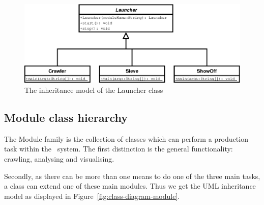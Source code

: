 \begin{figure}[htp]
  \centering
  \includegraphics{image/class-diagram-launcher}
  \caption{
    \label{fig:class-diagram-launcher}
    The inheritance model of the Launcher class}
\end{figure}

\subsection{Module class hierarchy}

The Module family is the collection of classes which can perform a production
task within the \Amber\ system. The first distinction is the general
functionality: crawling, analysing and visualising.

Secondly, as there can be more than one means to do one of the three main
tasks, a class can extend one of these main modules. Thus we get the UML
inheritance model as displayed in Figure~\ref{fig:class-diagram-module}.

